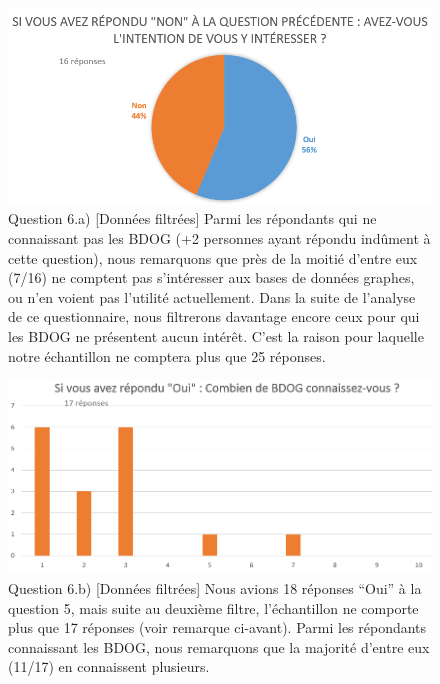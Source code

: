 \documentclass[a4paper,fleqn,12pt,oneside]{report}
\begin{document}
\begin{figure}[!ht]
\centering
\includegraphics[scale=0.8]{figures/QIntFilt.png}
\caption{Question 6.a) [Données filtrées] Parmi les répondants qui ne connaissant pas les BDOG (+2 personnes ayant  répondu indûment à cette question), nous remarquons que près de la moitié d'entre eux (7/16) ne comptent pas s'intéresser aux bases de données graphes, ou n'en voient pas l'utilité actuellement. Dans la suite de l'analyse de ce questionnaire, nous filtrerons davantage encore ceux pour qui les BDOG ne présentent aucun intérêt. C'est la raison pour laquelle notre échantillon ne comptera plus que 25 réponses.}
\label{fig:QIntFilt}
\end{figure}

\begin{figure}[!ht]
\centering
\includegraphics[scale=0.8]{figures/QNbFilt.png}
\caption{Question 6.b) [Données filtrées] Nous avions 18 réponses \enquote{Oui} à la question 5, mais suite au deuxième filtre, l'échantillon ne comporte plus que 17 réponses (voir remarque ci-avant). Parmi les répondants connaissant les BDOG, nous remarquons que la majorité d'entre eux (11/17) en connaissent plusieurs.}
\label{fig:QNbFilt}
\end{figure}
\end{document}
